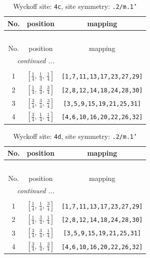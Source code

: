 \documentclass[fleqn,8pt]{jsarticle}
\begin{document}
\renewcommand{\arraystretch}{1.2}
\begin{longtable}{ccc}
\caption{Wyckoff site: {\tt 4c}, site symmetry: {\tt .2/m.1'}}
 \\
 \hline \hline
No. & position & mapping \\ \hline \endfirsthead

\multicolumn{2}{l}{\tablename\ \thetable{}} \\
 \hline \hline
No. & position & mapping \\ \hline \endhead

 \hline \hline
\multicolumn{2}{r}{\footnotesize\it continued ...} \\ \endfoot

 \hline \hline
\multicolumn{2}{r}{} \\ \endlastfoot

1 & $\left[ \frac{1}{4},\, \frac{1}{4},\, \frac{1}{4} \right]$ & {\tt [1,7,11,13,17,23,27,29]} \\ \hline
2 & $\left[ \frac{1}{4},\, \frac{3}{4},\, \frac{3}{4} \right]$ & {\tt [2,8,12,14,18,24,28,30]} \\ \hline
3 & $\left[ \frac{3}{4},\, \frac{3}{4},\, \frac{3}{4} \right]$ & {\tt [3,5,9,15,19,21,25,31]} \\ \hline
4 & $\left[ \frac{3}{4},\, \frac{1}{4},\, \frac{1}{4} \right]$ & {\tt [4,6,10,16,20,22,26,32]} \\
\end{longtable}
\renewcommand{\arraystretch}{1.2}
\begin{longtable}{ccc}
\caption{Wyckoff site: {\tt 4d}, site symmetry: {\tt .2/m.1'}}
 \\
 \hline \hline
No. & position & mapping \\ \hline \endfirsthead

\multicolumn{2}{l}{\tablename\ \thetable{}} \\
 \hline \hline
No. & position & mapping \\ \hline \endhead

 \hline \hline
\multicolumn{2}{r}{\footnotesize\it continued ...} \\ \endfoot

 \hline \hline
\multicolumn{2}{r}{} \\ \endlastfoot

1 & $\left[ \frac{1}{4},\, \frac{1}{4},\, \frac{3}{4} \right]$ & {\tt [1,7,11,13,17,23,27,29]} \\ \hline
2 & $\left[ \frac{1}{4},\, \frac{3}{4},\, \frac{1}{4} \right]$ & {\tt [2,8,12,14,18,24,28,30]} \\ \hline
3 & $\left[ \frac{3}{4},\, \frac{3}{4},\, \frac{1}{4} \right]$ & {\tt [3,5,9,15,19,21,25,31]} \\ \hline
4 & $\left[ \frac{3}{4},\, \frac{1}{4},\, \frac{3}{4} \right]$ & {\tt [4,6,10,16,20,22,26,32]} \\
\end{longtable}
\end{document}
